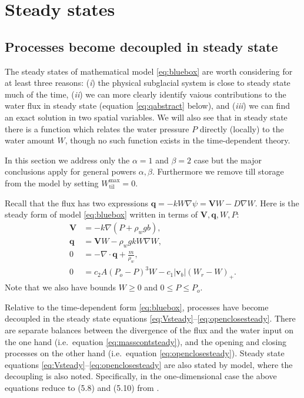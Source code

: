 \documentclass[11pt,final]{amsart}
\newcommand\bv{\mathbf{v}}
\newcommand\bV{\mathbf{V}}
\newcommand\bq{\mathbf{q}}
\newcommand{\Div}{\nabla\cdot}
\newcommand{\grad}{\nabla}
\newcommand{\Wtilmax}{W_{\text{til}}^{\text{max}}}
\begin{document}
\section{Steady states}  \label{sec:steadyverif}

\subsection*{Processes become decoupled in steady state}  The steady states of mathematical model \eqref{eq:bluebox} are worth considering for at least three reasons: (\emph{i}) the physical subglacial system is close to steady state much of the time, (\emph{ii}) we can more clearly identify vaious contributions to the water flux in steady state (equation \eqref{eq:qabstract} below), and (\emph{iii}) we can find an exact solution in two spatial variables.  We will also see that in steady state there is a function which relates the water pressure $P$ directly (locally) to the water amount $W$, though no such function exists in the time-dependent theory.

In this section we address only the $\alpha=1$ and $\beta=2$ case but the major conclusions apply for general powers $\alpha,\beta$.  Furthermore we remove till storage from the model by setting $\Wtilmax=0$.

Recall that the flux has two expressions $\bq = - k W \grad \psi = \bV W - D \grad W$.  Here is the steady form of model \eqref{eq:bluebox} written in terms of $\bV,\bq,W,P$:
\begin{align}
\bV &= - k \grad \left(P + \rho_w g b\right), \label{eq:Vsteady} \\
\bq &= \bV W - \rho_w g k W \grad W, \label{eq:qsteady} \\
0 &= - \Div \bq + \frac{m}{\rho_w}, \label{eq:masscontsteady} \\
0 &= c_2 A (P_o - P)^3 W - c_1 |\bv_b| (W_r - W)_+. \label{eq:openclosesteady}
\end{align}
Note that we also have bounds $W\ge 0$ and $0 \le P \le P_o$.

Relative to the time-dependent form \eqref{eq:bluebox}, processes have become decoupled in the steady state equations \eqref{eq:Vsteady}--\eqref{eq:openclosesteady}.  There are separate balances between the divergence of the flux and the water input on the one hand (i.e.~equation \eqref{eq:masscontsteady}), and the opening and closing processes on the other hand (i.e.~equation \eqref{eq:openclosesteady}).  Steady state equations \eqref{eq:Vsteady}--\eqref{eq:openclosesteady} are also stated by \cite{Schoofetal2012} model, where the decoupling is also noted.  Specifically, in the one-dimensional case the above equations reduce to (5.8) and (5.10) from \cite{Schoofetal2012}.
\end{document}
